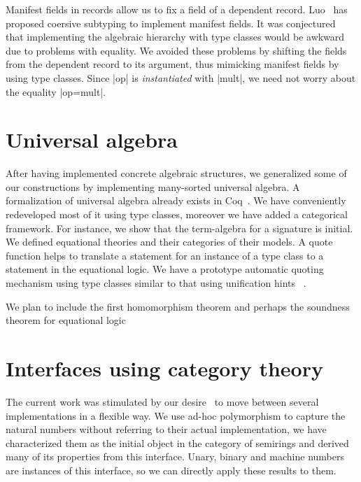 \documentclass{llncs}
\begin{document}
Manifest fields in records allow us to fix a field of a dependent record.
Luo~\cite{DBLP:conf/types/Luo08} has proposed coersive subtyping to implement manifest fields.
It was conjectured~\cite{Hints} that implementing the algebraic hierarchy with type classes would
be awkward due to problems with equality. We avoided these problems by shifting the fields
from the dependent record to its argument, thus mimicking manifest fields by using type classes.
Since |op| is \emph{instantiated} with |mult|, we need not worry about the
equality |op=mult|.

\section{Universal algebra}\label{univ}
After having implemented concrete algebraic structures, we generalized some of our constructions
by implementing many-sorted universal algebra. A formalization of universal algebra
already exists in Coq~\cite{DBLP:conf/tphol/Capretta99}. We have conveniently redeveloped most of it
using type classes, moreover we have added a categorical framework. For instance, we show that the
term-algebra for a signature is initial. We defined equational theories and their categories of
their models. A quote function helps to translate a statement for an instance of
a type class to a statement in the equational logic. We have a prototype automatic quoting mechanism
using type classes similar to that using unification hints~\cite{Hints} .

We plan to include the first homomorphism theorem and perhaps the soundness theorem for equational
logic


\section{Interfaces using category theory}\label{interfaces}\label{modul}
The current work was stimulated by our desire~\cite{Riemann} to move between several
implementations in a flexible way. We use ad-hoc polymorphism to capture the natural
numbers without referring to their actual implementation, we have
characterized them as the initial object in the category of semirings and derived many of its
properties from this interface. Unary, binary and machine numbers are
instances of this interface, so we can directly apply these results to them.
\end{document}
